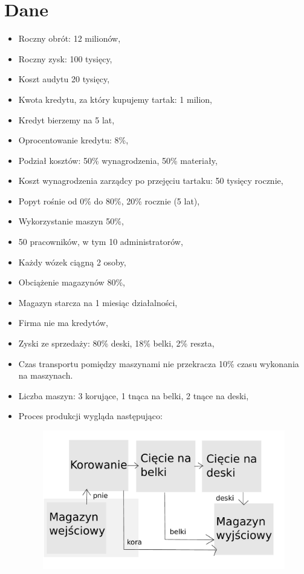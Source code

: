 \documentclass[a4paper]{article}
\begin{document}

\section{Dane}
\begin{itemize}
\item Roczny obrót: 12 milionów,
\item Roczny zysk: 100 tysięcy,
\item Koszt audytu 20 tysięcy,
\item Kwota kredytu, za który kupujemy tartak: 1 milion,
\item Kredyt bierzemy na 5 lat,
\item Oprocentowanie kredytu: 8\%,
\item Podział kosztów: 50\% wynagrodzenia, 50\% materiały,
\item Koszt wynagrodzenia zarządcy po przejęciu tartaku: 50 tysięcy rocznie,
\item Popyt rośnie od 0\% do 80\%, 20\% rocznie (5 lat),
\item Wykorzystanie maszyn 50\%,
\item 50 pracowników, w tym 10 administratorów,
\item Każdy wózek ciągną 2 osoby,
\item Obciążenie magazynów 80\%,
\item Magazyn starcza na 1 miesiąc działalności,
\item Firma nie ma kredytów,
\item Zyski ze sprzedaży: 80\% deski, 18\% belki, 2\% reszta,
\item Czas transportu pomiędzy maszynami nie przekracza 10\% czasu wykonania na maszynach.
\item Liczba maszyn: 3 korujące, 1 tnąca na belki, 2 tnące na deski,
\item Proces produkcji wygląda następująco:
\begin{figure}[H]
\centering
\includegraphics[scale=0.5]{img/Tartak.pdf}
\end{figure}
\end{itemize}
\end{document}
